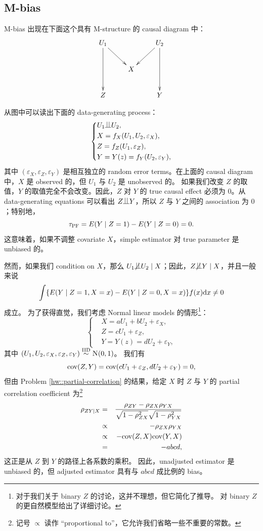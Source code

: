 \subsection{M-bias}
\label{section::m-bias}

M-bias 出现在下面这个具有 M-structure 的 causal diagram 中：
$$
\xymatrix{
U_1 \ar[dd]\ar[dr] &&U_2 \ar[dd]\ar[dl] \\
&X& \\
Z   && Y 
}
$$

从图中可以读出下面的 data-generating process：
$$
\left\{ 
\begin{aligned}
&U_1 \ind U_2 ,\\
&X = f_X(U_1, U_2, \varepsilon_X),\\
&Z=   f_Z(U_1,  \varepsilon_Z) , \\
&Y=      Y(z) =  f_Y(U_2, \varepsilon_Y) ,
\end{aligned}
\right. 
$$
其中 $(\varepsilon_X, \varepsilon_Z, \varepsilon_Y) $ 是相互独立的 random error terms。在上面的 causal diagram 中，$X$ 是 observed 的，但 $U_1$ 与 $U_2$ 是 unobserved 的。
如果我们改变 $Z$ 的取值，$Y$ 的取值完全不会改变。因此，$Z$ 对 $Y$ 的 true causal effect 必须为 $0$。从 data-generating equations 可以看出 $Z\ind Y$，所以 $Z$ 与 $Y$ 之间的 association 为 $0$；特别地，
$$
\tau_\textsc{PF} = E(Y\mid Z=1) - E(Y\mid Z=0) = 0.
$$
这意味着，如果不调整 covariate $X$，simple estimator 对 true parameter 是 unbiased 的。

然而，如果我们 condition on $X$，那么 $U_1\nind  U_2 \mid X$；因此，$Z\nind Y\mid X$，并且一般来说
$$
\int \{  E(Y\mid Z=1, X=x) - E(Y\mid Z=0, X=x) \} f(x) \textup{d} x \neq 0
$$
成立。
为了获得直觉，我们考虑 Normal linear models 的情形\footnote{对于我们关于 binary $Z$ 的讨论，这并不理想，但它简化了推导。\citet{ding2015adjust} 对 binary $Z$ 的更自然模型给出了详细讨论。}：
$$
\left\{ 
\begin{aligned}
&X = a U_1 + b U_2 +  \varepsilon_X,\\
&Z=   cU_1 +  \varepsilon_Z , \\
&Y=      Y(z) =  dU_2 +  \varepsilon_Y ,
\end{aligned}
\right. 
$$
其中 $(U_1, U_2, \varepsilon_X, \varepsilon_Z, \varepsilon_Y)  \iidsim \N01$。
我们有
$$
\textup{cov}(Z,Y) = \textup{cov}(  cU_1 +  \varepsilon_Z,  dU_2 +  \varepsilon_Y) = 0,
$$
但由 Problem \cref{hw::partial-correlation} 的结果，给定 $X$ 时 $Z$ 与 $Y$ 的 partial correlation coefficient 为\footnote{记号 $\propto$ 读作 ``proportional to''，它允许我们省略一些不重要的常数。}
\begin{eqnarray*}
\rho_{ZY\mid X} &=& \frac{   \rho_{ZY} - \rho_{ZX} \rho_{YX}  }{  \sqrt{  1-\rho_{ZX}^2 }  \sqrt{1- \rho_{YX}^2  }  }   
\\
&\propto &  - \rho_{ZX} \rho_{YX}  \\
&\propto &  - \textup{cov}(Z, X) \textup{cov}(Y, X)  \\
&=&  - abcd,
\end{eqnarray*}
这正是从 $Z$ 到 $Y$ 的路径上各系数的乘积。
因此，unadjusted estimator 是 unbiased 的，但 adjusted estimator 具有与 $abcd$ 成比例的 bias。


